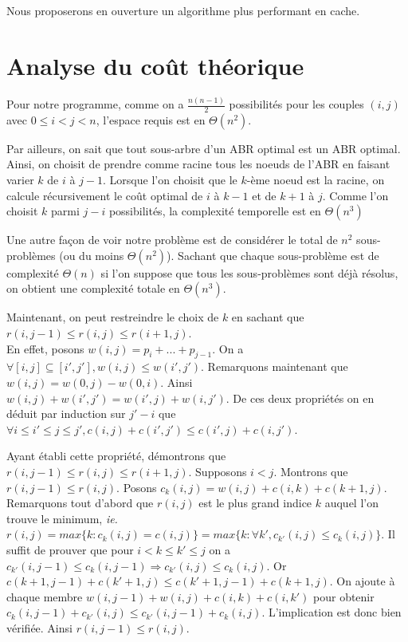 \documentclass[a4paper, 10pt, french]{article}
\begin{document}
Nous proposerons en ouverture un algorithme plus performant en cache.
\section{Analyse du coût théorique}
Pour notre programme, comme on a $\frac{n(n-1)}{2}$ possibilités pour les couples $(i, j)$ avec $0 \leq i < j < n$, l'espace requis est en $\Theta(n^2)$.

Par ailleurs, on sait que tout sous-arbre d'un ABR optimal est un ABR optimal. Ainsi, on choisit de prendre comme racine tous les noeuds de l'ABR en faisant varier $k$ de $i$ à $j - 1$. Lorsque l'on choisit que le $k$-ème noeud est la racine, on calcule récursivement le coût optimal de $i$ à $k - 1$ et de $k + 1$ à $j$. Comme l'on choisit $k$ parmi $j - i$ possibilités, la complexité temporelle est en $\Theta(n^3)$

Une autre façon de voir notre problème est de considérer le total de $n^2$ sous-problèmes (ou du moins $\Theta(n^2)$). Sachant que chaque sous-problème est de complexité $\Theta(n)$ si l'on suppose que tous les sous-problèmes sont déjà résolus, on obtient une complexité totale en $\Theta(n^3)$.

Maintenant, on peut restreindre le choix de $k$ en sachant que $r(i, j - 1) \leq r(i, j) \leq r(i + 1, j)$. \\

En effet, posons $w(i, j) = p_{i} + ... + p_{j - 1}$. On a $\forall [i, j] \subseteq [i', j'], w(i, j) \leq w(i', j')$. Remarquons maintenant que $w(i, j) = w(0, j) - w(0, i)$. Ainsi $w(i, j) + w(i', j') = w(i', j) + w(i, j')$. De ces deux propriétés on en déduit par induction sur $j' - i$ que $\forall i \leq i'\leq j \leq j', c(i, j) + c(i', j') \leq c(i', j) + c(i, j')$.

Ayant établi cette propriété, démontrons que $r(i, j - 1) \leq r(i, j) \leq r(i + 1, j)$. Supposons $i < j$. Montrons que $r(i, j - 1) \leq r(i, j)$. Posons $c_k(i, j) = w(i, j) + c(i, k) + c(k + 1, j)$. Remarquons tout d'abord que $r(i, j)$ est le plus grand indice $k$ auquel l'on trouve le minimum, {\em ie.} $r(i, j) = max\{k: c_k(i, j) = c(i, j)\} = max\{k : \forall k', c_{k'}(i, j) \leq c_k(i, j)\}$.  Il suffit de prouver que pour $i < k \leq k' \leq j$ on a $c_{k'}(i, j - 1) \leq c_k(i, j - 1) \Rightarrow c_{k'}(i, j) \leq c_k(i, j)$. Or $c(k + 1, j - 1) + c(k' + 1, j) \leq c(k' + 1, j - 1) + c(k + 1, j)$. On ajoute à chaque membre $w(i, j - 1) + w(i, j) + c(i, k) + c(i, k')$ pour obtenir $c_k(i, j - 1) + c_{k'}(i, j) \leq c_{k'}(i, j - 1) + c_k(i, j)$. L'implication est donc bien vérifiée. Ainsi $r(i, j - 1) \leq r(i, j)$.
\end{document}
